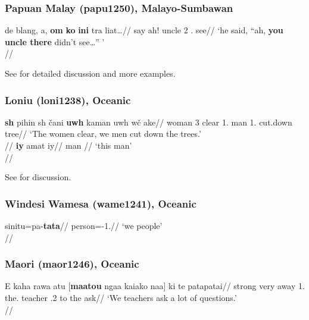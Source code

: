 \subsubsection{Papuan Malay (papu1250), Malayo-Sumbawan}

\ex
\begingl
\gla de blang, a, \textbf{om} \textbf{ko} \textbf{ini} tra liat\ldots//
\Sg{} say ah! uncle 2\Sg{} \Dem.\Prox{} \Neg{} see//
\glft `he said, ``ah, \textbf{you uncle there} didn't see\ldots'' '\\\citep[353, (66)]{kluge2017}//
\endgl
\xe

See \citet[ch. 6.2]{kluge2017} for detailed discussion and more examples.

\subsubsection{Loniu (loni1238), Oceanic}
	

\pex
\a \begingl
\gla \textbf{s\textepsilon{}h} pihin s\textepsilon{}h \v{c}ani \textbf{uw\textepsilon{}h} kaman uw\textepsilon{}h w\textepsilon{}\v{c}\textepsilon{} ake//
\Pl{} woman 3\Pl{} clear 1\Pl.\Excl{} man 1\Pl.\Excl{} cut.down tree//
\glft `The women clear, we men cut down the trees.'\\\citep[90, (6)]{hamel1994}//
\endgl
\a 
\begingl
\gla \textbf{iy} amat iy\textopeno{}//
\Sg{} man \Dem//
\glft `this man'\\\citep[100, (89)]{hamel1994}//
\endgl
\xe

See \citet[sec. 4.2.1]{hamel1994} for discussion.

\subsubsection{Windesi Wamesa (wame1241), Oceanic}

\ex
\begingl
\gla sinitu=pa-\textbf{tata}//
\glb person=\Det{}-1\Pl{}.\Incl{}//
\glft `we people' \\{\citep[144, (3.46)]{gasser2014}}//
\endgl
\xe

\subsubsection{Maori (maor1246), Oceanic}

\ex 
\begingl
\gla E kaha rawa atu [\textbf{maatou} ngaa  kaiako naa] ki te pata\textperiodcentered{}patai//
\glb \Tam{} strong very away 1\Pl.\Excl{} the.\Pl{} teacher \Dem.2 to the \Redup{}\textperiodcentered{}ask//
\glft `We teachers ask a lot of questions.'\\\citep[373, (1673)]{bauer1993}//
\endgl
\xe

